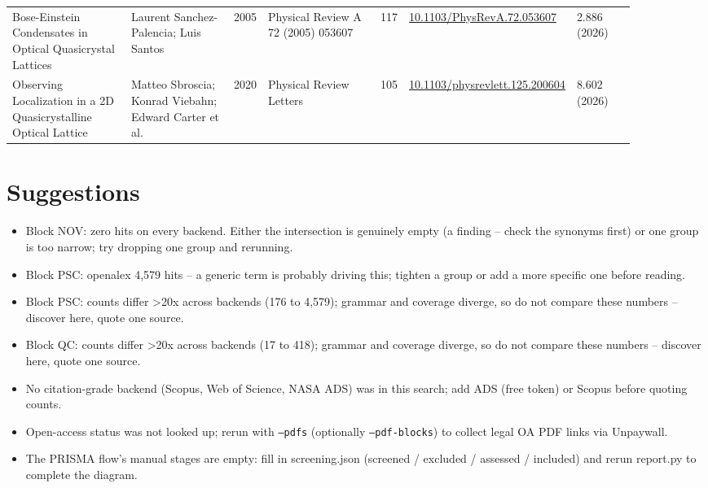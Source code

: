 \documentclass[10pt,a4paper]{article}
\begin{document}
{\begin{longtable}{p{0.204\linewidth}p{0.188\linewidth}p{0.043\linewidth}p{0.204\linewidth}p{0.043\linewidth}p{0.108\linewidth}p{0.102\linewidth}}
Bose-Einstein Condensates in Optical Quasicrystal Lattices & Laurent Sanchez-Palencia; Luis Santos & 2005 & Physical Review A 72 (2005) 053607 & 117 & \href{https://doi.org/10.1103/PhysRevA.72.053607}{10.1103/PhysRevA.72.053607} & 2.886 (2026) \\
Observing Localization in a 2D Quasicrystalline Optical Lattice & Matteo Sbroscia; Konrad Viebahn; Edward Carter et al. & 2020 & Physical Review Letters & 105 & \href{https://doi.org/10.1103/physrevlett.125.200604}{10.1103/physrevlett.125.200604} & 8.602 (2026) \\
\hline
\end{longtable}}
\section*{Suggestions}
\begin{itemize}\item Block NOV: zero hits on every backend. Either the intersection is genuinely empty (a finding -- check the synonyms first) or one group is too narrow; try dropping one group and rerunning.\item Block PSC: openalex 4,579 hits -- a generic term is probably driving this; tighten a group or add a more specific one before reading.\item Block PSC: counts differ >20x across backends (176 to 4,579); grammar and coverage diverge, so do not compare these numbers -- discover here, quote one source.\item Block QC: counts differ >20x across backends (17 to 418); grammar and coverage diverge, so do not compare these numbers -- discover here, quote one source.\item No citation-grade backend (Scopus, Web of Science, NASA ADS) was in this search; add ADS (free token) or Scopus before quoting counts.\item Open-access status was not looked up; rerun with \texttt{--pdfs} (optionally \texttt{--pdf-blocks}) to collect legal OA PDF links via Unpaywall.\item The PRISMA flow's manual stages are empty: fill in screening.json (screened / excluded / assessed / included) and rerun report.py to complete the diagram.\end{itemize}
\end{document}
